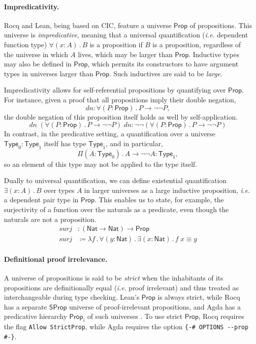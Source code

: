 \documentclass{article}
\makeatletter
\newcommand{\ie}{\textit{i.e.}\@\xspace}
\newcommand{\kw}[1]{\mathsf{#1}}
\newcommand{\code}[1]{\texttt{#1}}
\makeatother
\begin{document}
\paragraph{Impredicativity.}
Rocq and Lean, being based on CIC,
feature a universe $\kw{Prop}$ of propositions.
This universe is \emph{impredicative},
meaning that a universal quantification (\ie dependent function type)
$\forall (x : A) \mathpunct{.} B$ is a proposition if $B$ is a proposition,
regardless of the universe in which $A$ lives,
which may be larger than $\kw{Prop}$.
Inductive types may also be defined in $\kw{Prop}$,
which permits its constructors to have argument types
in universes larger than $\kw{Prop}$.
Such inductives are said to be \emph{large}.

Impredicativity allows for self-referential propositions by quantifying over $\kw{Prop}$.
For instance, given a proof that all propositions imply their double negation,
$$\mathit{dn}: \forall (P : \kw{Prop})\mathpunct{.} P \to \neg \neg P,$$
the double negation of this proposition itself holds as well by self-application.
$$\mathit{dn} \; (\forall (P : \kw{Prop})\mathpunct{.} P \to \neg \neg P) \; \mathit{dn} : \neg \neg (\forall (P : \kw{Prop})\mathpunct{.} P \to \neg \neg P)$$
In contrast, in the predicative setting,
a quantification over a universe $\kw{Type}_0 : \kw{Type}_1$ itself has type $\kw{Type}_1$,
and in particular,
$$\Pi (A : \kw{Type}_0)\mathpunct{.} A \to \neg \neg A : \kw{Type}_1,$$
so an element of this type may not be applied to the type itself.

Dually to universal quantification,
we can define existential quantification $\exists (x : A) \mathpunct{.} B$
over types $A$ in larger universes as a large inductive proposition,
\ie a dependent pair type in $\kw{Prop}$.
This enables us to state, for example,
the surjectivity of a function over the naturals as a predicate,
even though the naturals are not a proposition.
%
\begin{align*}
  \mathit{surj} &: (\kw{Nat} \to \kw{Nat}) \to \kw{Prop} \\
  \mathit{surj} &\coloneqq \lambda f \mathpunct{.}
    \forall (y : \kw{Nat}) \mathpunct{.} \exists (x : \kw{Nat}) \mathpunct{.} f \; x \equiv y
\end{align*}

\paragraph{Definitional proof irrelevance.}
A universe of propositions is said to be \emph{strict}
when the inhabitants of its propositions are definitionally equal
(\ie proof irrelevant)
and thus treated as interchangeable during type checking.
Lean's $\kw{Prop}$ is always strict, while
Rocq has a separate $\kw{SProp}$ universe of proof-irrelevant propositions,
and Agda has a predicative hierarchy $\kw{Prop}_i$ of such universes \citep{sprop}.
To use strict $\kw{Prop}$,
Rocq requires the flag \code{Allow StrictProp},
while Agda requires the option \code{\{-\# OPTIONS -{}-prop \#-\}}.
\end{document}
